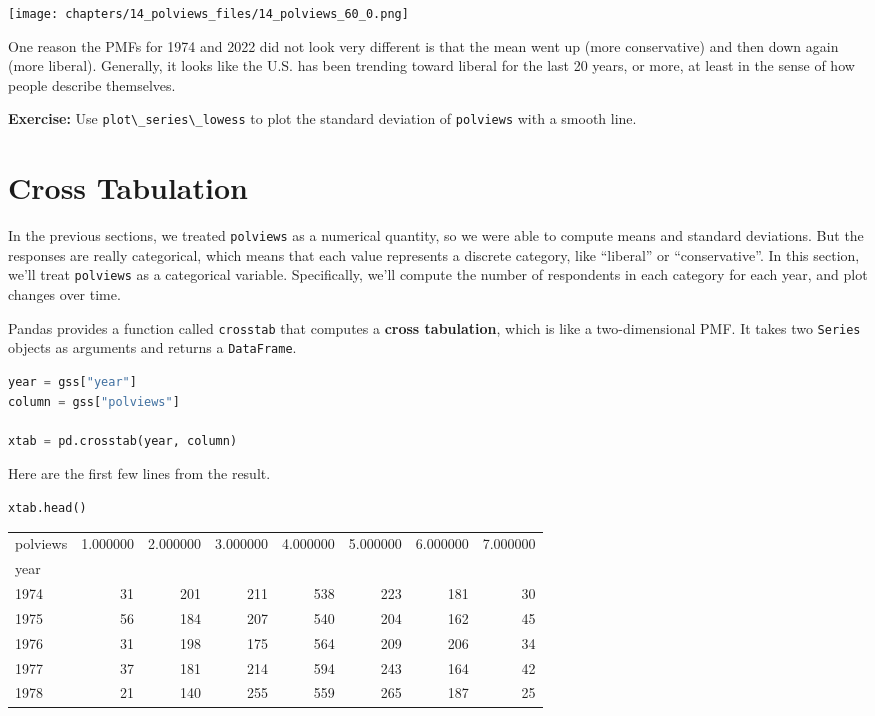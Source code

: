 \begin{center}
\texttt{[image: chapters/14\_polviews\_files/14\_polviews\_60\_0.png]}
\end{center}

One reason the PMFs for 1974 and 2022 did not look very different is
that the mean went up (more conservative) and then down again (more
liberal). Generally, it looks like the U.S. has been trending toward
liberal for the last 20 years, or more, at least in the sense of how
people describe themselves.

\textbf{Exercise:} Use \passthrough{\lstinline!plot\_series\_lowess!} to
plot the standard deviation of \passthrough{\lstinline!polviews!} with a
smooth line.

\hypertarget{cross-tabulation}{%
\section{Cross Tabulation}\label{cross-tabulation}}

In the previous sections, we treated \passthrough{\lstinline!polviews!}
as a numerical quantity, so we were able to compute means and standard
deviations. But the responses are really categorical, which means that
each value represents a discrete category, like ``liberal'' or
``conservative''. In this section, we'll treat
\passthrough{\lstinline!polviews!} as a categorical variable.
Specifically, we'll compute the number of respondents in each category
for each year, and plot changes over time.

Pandas provides a function called \passthrough{\lstinline!crosstab!}
that computes a \textbf{cross tabulation}, which is like a
two-dimensional PMF. It takes two \passthrough{\lstinline!Series!}
objects as arguments and returns a \passthrough{\lstinline!DataFrame!}.

\begin{lstlisting}[language=Python,style=source]
year = gss["year"]
column = gss["polviews"]

xtab = pd.crosstab(year, column)
\end{lstlisting}

Here are the first few lines from the result.

\begin{lstlisting}[language=Python,style=source]
xtab.head()
\end{lstlisting}

\begin{tabular}{lrrrrrrr}
\midrule
polviews & 1.000000 & 2.000000 & 3.000000 & 4.000000 & 5.000000 & 6.000000 & 7.000000 \\
year &  &  &  &  &  &  &  \\
\midrule
1974 & 31 & 201 & 211 & 538 & 223 & 181 & 30 \\
1975 & 56 & 184 & 207 & 540 & 204 & 162 & 45 \\
1976 & 31 & 198 & 175 & 564 & 209 & 206 & 34 \\
1977 & 37 & 181 & 214 & 594 & 243 & 164 & 42 \\
1978 & 21 & 140 & 255 & 559 & 265 & 187 & 25 \\
\midrule
\end{tabular}


